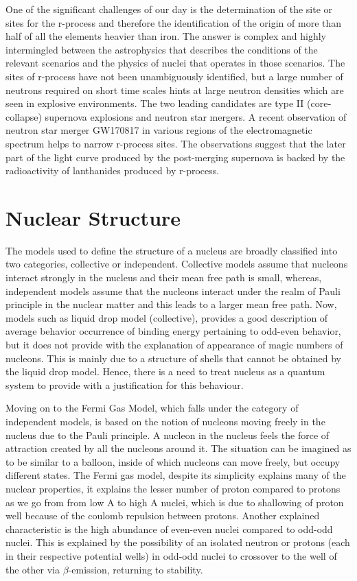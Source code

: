 \documentclass[a4paper,12pt,twoside]{report}
\begin{document}
One of the significant challenges of our day is the determination of the site or sites for the r-process and therefore the identification of the origin of more than half of all the elements heavier than iron. The answer is complex and highly intermingled between the astrophysics that describes the conditions of the relevant scenarios and the physics of nuclei that operates in those scenarios. The sites of r-process have not been unambiguously identified, but a large number of neutrons required on short time scales hints at large neutron densities which are seen in explosive environments. The two leading candidates are type II (core‐collapse) supernova explosions and neutron star mergers. A recent observation of neutron star merger GW170817 \cite{gw170817} in various regions of the electromagnetic spectrum helps to narrow r-process sites. The observations suggest that the later part of the light curve produced by the post-merging supernova is backed by the radioactivity of lanthanides produced by r-process. 

\section{Nuclear Structure}


The models used to define the structure of a nucleus are broadly classified into two categories, collective or independent. Collective models assume that nucleons interact strongly in the nucleus and their mean free path is small, whereas, independent models assume that the nucleons interact under the realm of Pauli principle in the nuclear matter and this leads to a larger mean free path. Now, models such as liquid drop model (collective), provides a good description of average behavior occurrence of binding energy pertaining to odd-even behavior, but it does not provide with the explanation of appearance of magic numbers of nucleons. This is mainly due to a structure of shells that cannot be obtained by the liquid drop model. Hence, there is a need to treat nucleus as a quantum system to provide with a justification for this behaviour. 

Moving on to the Fermi Gas Model, which falls under the category of independent models, is based on the notion of nucleons moving freely in the nucleus due to the Pauli principle. A nucleon in the nucleus feels the force of attraction created by all the nucleons around it. The situation can be imagined as to be similar to a balloon, inside of which nucleons can move freely, but occupy different states. The Fermi gas model, despite its simplicity explains many of the nuclear properties, it explains the lesser number of proton compared to protons as we go from from low A to high A nuclei, which is due to shallowing of proton well because of the coulomb repulsion between protons. Another explained characteristic is the high abundance of even-even nuclei compared to odd-odd nuclei. This is explained by the possibility of an isolated neutron or protons (each in their respective potential wells) in odd-odd nuclei to crossover to the well of the other via $\beta$-emission, returning to stability.
\end{document}
